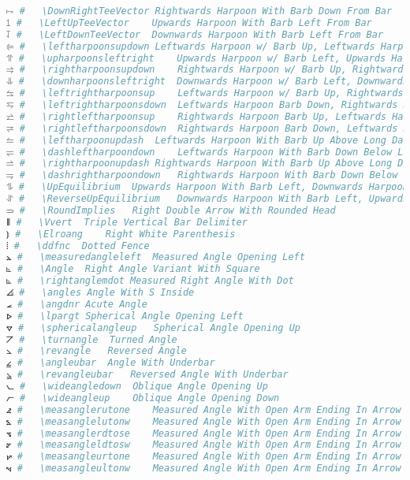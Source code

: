 \begin{lstlisting}[language=Julia, linewidth=\textwidth]
⥟ #   \DownRightTeeVector Rightwards Harpoon With Barb Down From Bar
⥠ #   \LeftUpTeeVector    Upwards Harpoon With Barb Left From Bar
⥡ #   \LeftDownTeeVector  Downwards Harpoon With Barb Left From Bar
⥢ #   \leftharpoonsupdown Leftwards Harpoon w/ Barb Up, Leftwards Harpoon w/ Barb Down
⥣ #   \upharpoonsleftright    Upwards Harpoon w/ Barb Left, Upwards Harpoon w/ Barb Right
⥤ #   \rightharpoonsupdown    Rightwards Harpoon w/ Barb Up, Rightwards Harpoon Barb Down
⥥ #   \downharpoonsleftright  Downwards Harpoon w/ Barb Left, Downwards Harpoon Barb Right
⥦ #   \leftrightharpoonsup    Leftwards Harpoon w/ Barb Up, Rightwards Harpoon w/ Barb Up
⥧ #   \leftrightharpoonsdown  Leftwards Harpoon Barb Down, Rightwards Harpoon Barb Down
⥨ #   \rightleftharpoonsup    Rightwards Harpoon Barb Up, Leftwards Harpoon With Barb Up
⥩ #   \rightleftharpoonsdown  Rightwards Harpoon Barb Down, Leftwards Harpoon Barb Down
⥪ #   \leftharpoonupdash  Leftwards Harpoon With Barb Up Above Long Dash
⥫ #   \dashleftharpoondown    Leftwards Harpoon With Barb Down Below Long Dash
⥬ #   \rightharpoonupdash Rightwards Harpoon With Barb Up Above Long Dash
⥭ #   \dashrightharpoondown   Rightwards Harpoon With Barb Down Below Long Dash
⥮ #   \UpEquilibrium  Upwards Harpoon With Barb Left, Downwards Harpoon With Barb Right
⥯ #   \ReverseUpEquilibrium   Downwards Harpoon With Barb Left, Upwards Harpoon Barb Right
⥰ #   \RoundImplies   Right Double Arrow With Rounded Head
⦀ #   \Vvert  Triple Vertical Bar Delimiter
⦆ #   \Elroang    Right White Parenthesis
⦙ #   \ddfnc  Dotted Fence
⦛ #   \measuredangleleft  Measured Angle Opening Left
⦜ #   \Angle  Right Angle Variant With Square
⦝ #   \rightanglemdot Measured Right Angle With Dot
⦞ #   \angles Angle With S Inside
⦟ #   \angdnr Acute Angle
⦠ #   \lpargt Spherical Angle Opening Left
⦡ #   \sphericalangleup   Spherical Angle Opening Up
⦢ #   \turnangle  Turned Angle
⦣ #   \revangle   Reversed Angle
⦤ #   \angleubar  Angle With Underbar
⦥ #   \revangleubar   Reversed Angle With Underbar
⦦ #   \wideangledown  Oblique Angle Opening Up
⦧ #   \wideangleup    Oblique Angle Opening Down
⦨ #   \measanglerutone    Measured Angle With Open Arm Ending In Arrow Up And Right
⦩ #   \measanglelutonw    Measured Angle With Open Arm Ending In Arrow Up And Left
⦪ #   \measanglerdtose    Measured Angle With Open Arm Ending In Arrow Down And Right
⦫ #   \measangleldtosw    Measured Angle With Open Arm Ending In Arrow Down And Left
⦬ #   \measangleurtone    Measured Angle With Open Arm Ending In Arrow Right And Up
⦭ #   \measangleultonw    Measured Angle With Open Arm Ending In Arrow Left And Up

\end{lstlisting}
